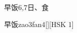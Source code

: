\begin{entry}{早饭}{6,7}{⽇、⾷}
  \begin{phonetics}{早饭}{zao3fan4}[][HSK 1]
  \end{phonetics}
\end{entry}
